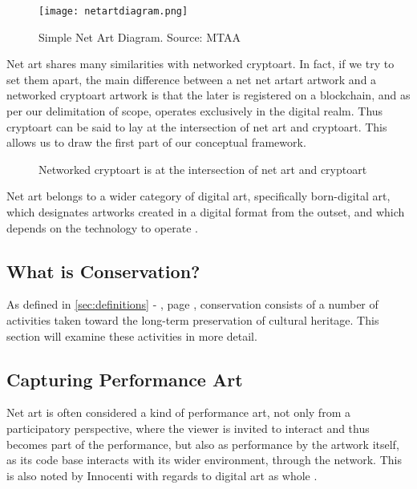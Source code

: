 \begin{figure}[h]
    \centering
    \texttt{[image: netartdiagram.png]}
    \caption[Simple Net Art Diagram]{Simple Net Art Diagram. Source: MTAA \cite{NETARTANTHOLOGY2016a}}
    \label{fig:simplenetartdiag}
\end{figure}

Net art shares many similarities with networked cryptoart. In fact, if we try to set them apart, the main difference between a net net artart artwork and a networked cryptoart artwork is that the later is registered on a blockchain, and as per our delimitation of scope, operates exclusively in the digital realm. Thus cryptoart can be said to lay at the intersection of net art and cryptoart. This allows us to draw the first part of our conceptual framework.


\begin{figure}[h]
    \centering
    
    \caption[Networked cryptoart at the intersection of net art and cryptoart]{Networked cryptoart is at the intersection of net art and cryptoart}
    \label{fig:netart-cryptoart}
\end{figure}

Net art belongs to a wider category of digital art, specifically born-digital art, which designates artworks created in a digital format from the outset, and which depends on the technology to operate \cite{innocentiKeepingBitsAlive2013}.

\subsection{What is Conservation?}

As defined in \autoref{sec:definitions} -  , page \pageref{sec:definitions}, conservation consists of a number of activities taken toward the long-term preservation of cultural heritage. This section will examine these activities in more detail.



\subsection{Capturing Performance Art}

Net art is often considered a kind of performance art, not only from a participatory perspective, where the viewer is invited to interact and thus becomes part of the performance, but also as performance by the artwork itself, as its code base interacts with its wider environment, through the network. This is also noted by Innocenti with regards to digital art as whole \cite{innocentiKeepingBitsAlive2013}.

